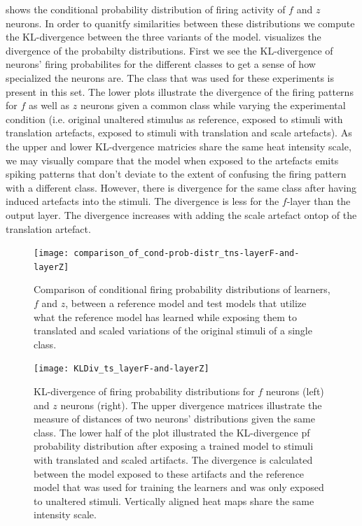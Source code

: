 \documentclass{report}
\begin{document}
 shows the conditional probability distribution of firing activity of $f$ and $z$ neurons. In order to quanitfy similarities between these distributions we compute the KL-divergence between the three variants of the model.  visualizes the divergence of the probabilty distributions. First we see the KL-divergence of neurons' firing probabilites for the different classes to get a sense of how specialized the neurons are. The class that was used for these experiments is present in this set. The lower plots illustrate the divergence of the firing patterns for $f$ as well as $z$ neurons given a common class while varying the experimental condition (i.e. original unaltered stimulus as reference, exposed to stimuli with translation artefacts, exposed to stimuli with translation and scale artefacts). As the upper and lower KL-dvergence matricies share the same heat intensity scale, we may visually compare that the model when exposed to the artefacts emits spiking patterns that don't deviate to the extent of confusing the firing pattern with a different class. However, there is divergence for the same class after having induced artefacts into the stimuli. The divergence is less for the $f$-layer than the output layer. The divergence increases with adding the scale artefact ontop of the translation artefact.

\begin{figure}[ht]
\centering
\texttt{[image: comparison\_of\_cond-prob-distr\_tns-layerF-and-layerZ]}
\caption{Comparison of conditional firing probability distributions of learners, $f$ and $z$, between a reference model and test models that utilize what the reference model has learned while exposing them to translated and scaled variations of the original stimuli of a single class.
\label{fig:comparison_of_cond-prob-distr_tns-layerF-and-layerZ}}
\end{figure}

\begin{figure}[ht]
\centering
\texttt{[image: KLDiv\_ts\_layerF-and-layerZ]}
\caption{KL-divergence of firing probability distributions for $f$ neurons (left) and $z$ neurons (right). The upper divergence matrices illustrate the measure of distances of two neurons' distributions given the same class. The lower half of the plot illustrated the KL-divergence pf probability distribution after exposing a trained model to stimuli with translated and scaled artifacts. The divergence is calculated between the model exposed to these artifacts and the reference model that was used for training the learners and was only exposed to unaltered stimuli. Vertically aligned heat maps share the same intensity scale.
\label{fig:KLDiv_ts_layerF-and-layerZ}}
\end{figure}
\end{document}
